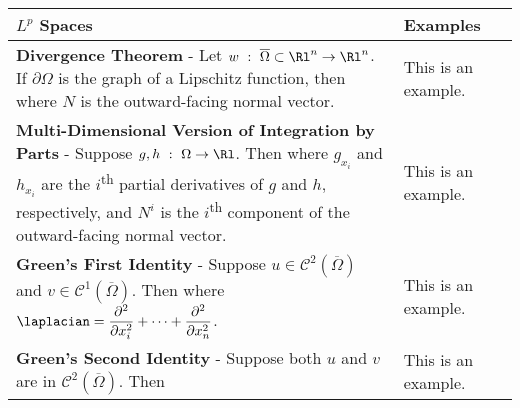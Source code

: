 \begin{longtable}{|*{3}{>{\centering\arraybackslash}p{}|}}
    \toprule
        \textbf{$L^p$ Spaces} & \textbf{Examples} \\[6pt]
        \midrule
        \endhead
            \textbf{Divergence Theorem} - Let $w\ :\ \overline{\Omega} \subset \Rl^n \rightarrow \Rl^n$.  If $\partial\Omega$ is the graph of a Lipschitz function, then \newline {$\!\begin{gathered} \int_\Omega \div w \dd x = \int_{\partial \Omega} w \cdot N \dd S \end{gathered}$} \newline where $N$ is the outward-facing normal vector. & This is an example. \\[6pt] \hline
            
            \textbf{Multi-Dimensional Version of Integration by Parts} - Suppose $g,h\ :\ \Omega \rightarrow \Rl$.  Then \newline {$\!\begin{gathered} \int_\Omega g h_{x_i} \dd x = \int_{\partial\Omega} gh N^i \dd S - \int_\Omega g_{x_i}h \dd x \end{gathered}$} \newline where $g_{x_i}$ and $h_{x_i}$ are the $i$\textsuperscript{th} partial derivatives of $g$ and $h$, respectively, and $N^i$ is the $i$\textsuperscript{th} component of the outward-facing normal vector. & This is an example. \\[6pt] \hline
            
            \textbf{Green's First Identity} - Suppose $u \in \mathcal{C}^2(\overline{\Omega})$ and $v \in \mathcal{C}^1(\overline{\Omega})$.  Then \newline {$\!\begin{gathered} \int_\Omega \grad v \cdot \grad u \dd x + \int_\Omega v \laplacian u \dd x = \int_\Omega \div\qty(v\grad u) \dd x \\ \ \ \ \qquad\qquad\qquad\qquad\qquad = \int_{\partial\Omega} v \frac{\partial u}{\partial N}\dd X. \end{gathered}$} \newline where $\laplacian = \dfrac{\partial^2}{\partial x_i^2} + \dots + \dfrac{\partial^2}{\partial x_n^2}$. & This is an example. \\[6pt] \hline
            
            \textbf{Green's Second Identity} - Suppose both $u$ and $v$ are in $\mathcal{C}^2(\overline{\Omega})$.  Then \newline {$\!\begin{gathered} \int_\Omega (v \laplacian u - u \laplacian v) \dd x = \int_{\partial \Omega} \qty[v \frac{\partial u}{\partial N} - u \frac{\partial v}{\partial N}]\dd S. \end{gathered}$} & This is an example. \\[6pt] \hline
            

\end{longtable}
